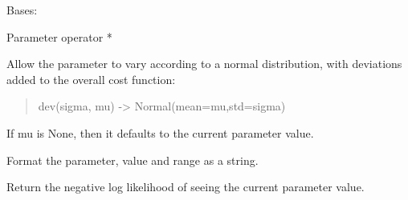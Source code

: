 \documentclass[letterpaper,10pt,english]{sphinxmanual}
\begin{document}
\begin{fulllineitems}
\label{api/mystic.parameter:refl1d.mystic.parameter.OperatorMul}
Bases: {\hyperref[api/mystic.parameter:refl1d.mystic.parameter.BaseParameter]{}}

Parameter operator *

\begin{fulllineitems}
\label{api/mystic.parameter:refl1d.mystic.parameter.OperatorMul.dev}
Allow the parameter to vary according to a normal distribution, with
deviations added to the overall cost function:
\begin{quote}

dev(sigma, mu) -\textgreater{} Normal(mean=mu,std=sigma)
\end{quote}

If mu is None, then it defaults to the current parameter value.

\end{fulllineitems}


\begin{fulllineitems}
\label{api/mystic.parameter:refl1d.mystic.parameter.OperatorMul.dvalue}
\end{fulllineitems}


\begin{fulllineitems}
\label{api/mystic.parameter:refl1d.mystic.parameter.OperatorMul.format}
Format the parameter, value and range as a string.

\end{fulllineitems}


\begin{fulllineitems}
\label{api/mystic.parameter:refl1d.mystic.parameter.OperatorMul.nllf}
Return the negative log likelihood of seeing the current parameter value.

\end{fulllineitems}


\end{fulllineitems}
\end{document}
